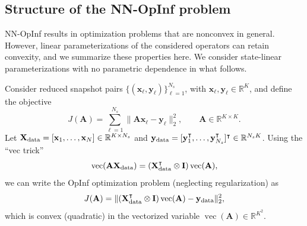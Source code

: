\documentclass[3p,computermodern,11pt]{elsarticle}
\numberwithin{equation}{section}
\newcommand{\RR}[1]{\mathbb{R}^{#1}}
\newcommand{\romDim}{K}
\begin{document}
\subsection{Structure of the NN-OpInf problem}
NN-OpInf results in optimization problems that are nonconvex in general. However, linear parameterizations of the considered operators can retain convexity, and we summarize these properties here. We consider state-linear parameterizations with no parametric dependence in what follows. 

Consider reduced snapshot pairs $\{(\mathbf{x}_\ell,\mathbf{y}_\ell)\}_{\ell=1}^{N_s}$, with $\mathbf{x}_\ell,\mathbf{y}_\ell\in\RR{\romDim}$, and define the objective
\begin{equation}
J(\mathbf{A})=
\sum_{\ell=1}^{N_s}\| \mathbf{A}\mathbf{x}_\ell - \mathbf{y}_\ell \|_2^2,
\qquad
\mathbf{A}\in\RR{\romDim\times\romDim}.
\end{equation}
Let $\mathbf{X}_{\rm data}=[\mathbf{x}_1,\ldots,\mathbf{x}_N]\in\RR{\romDim\times N_s}$ and $\mathbf{y}_{\rm data}=[\mathbf{y}_1^\intercal,\ldots,\mathbf{y}_{N_s}^\intercal]^\intercal\in\RR{N_s\romDim}$. Using the ``vec trick'' 
\[
\operatorname{vec}(\mathbf{A}\mathbf{X}_{\rm data})=
(\mathbf{X}_{\rm data}^{\intercal}\otimes\mathbf{I})\operatorname{vec}(\mathbf{A}),
\]
we can write the OpInf optimization problem (neglecting regularization) as
\begin{equation}
J(\mathbf{A})=\|
(\mathbf{X}_{\rm data}^{\intercal}\otimes\mathbf{I})\operatorname{vec}(\mathbf{A})-\mathbf{y}_{\rm data}
\|_2^2,
\end{equation}
which is convex (quadratic) in the vectorized variable $\operatorname{vec}(\mathbf{A})\in\mathbb{R}^{K^2}$.
\end{document}
